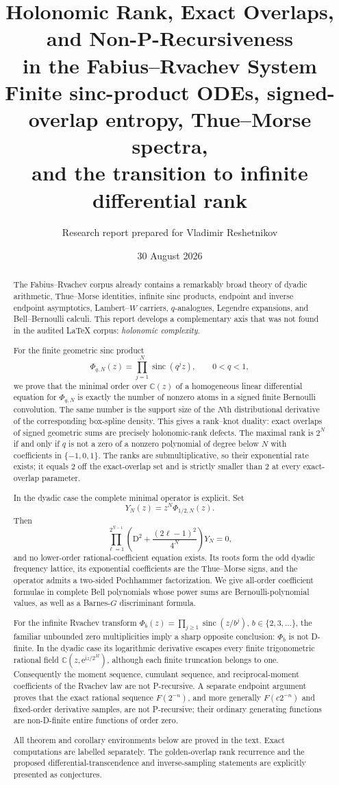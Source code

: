 \documentclass[11pt]{article}
\title{\textbf{Holonomic Rank, Exact Overlaps, and Non-P-Recursiveness\\
 in the Fabius--Rvachev System}\\[0.6em]
\large Finite sinc-product ODEs, signed-overlap entropy, Thue--Morse spectra,\\
and the transition to infinite differential rank}
\author{Research report prepared for Vladimir Reshetnikov}
\date{30 August 2026}
\numberwithin{equation}{section}
\theoremstyle{definition}
\theoremstyle{remark}
\newcommand{\C}{\mathbb C}
\newcommand{\ii}{\mathrm i}
\newcommand{\e}{\mathrm e}
\newcommand{\D}{\mathrm D}
\newcommand{\sinc}{\operatorname{sinc}}
\begin{document}
\maketitle

\begin{abstract}
The Fabius--Rvachev corpus already contains a remarkably broad theory of dyadic
arithmetic, Thue--Morse identities, infinite sinc products, endpoint and inverse
endpoint asymptotics, Lambert--$W$ carriers, $q$-analogues, Legendre expansions,
and Bell--Bernoulli calculi.  This report develops a complementary axis that was
not found in the audited LaTeX corpus: \emph{holonomic complexity}.

For the finite geometric sinc product
\[
  \Phi_{q,N}(z)=\prod_{j=1}^{N}\sinc(q^jz),\qquad 0<q<1,
\]
we prove that the minimal order over $\C(z)$ of a homogeneous linear
differential equation for $\Phi_{q,N}$ is exactly the number of nonzero atoms in
a signed finite Bernoulli convolution.  The same number is the support size of
the $N$th distributional derivative of the corresponding box-spline density.
This gives a rank--knot duality: exact overlaps of signed geometric sums are
precisely holonomic-rank defects.  The maximal rank is $2^N$ if and only if $q$
is not a zero of a nonzero polynomial of degree below $N$ with coefficients in
$\{-1,0,1\}$.  The ranks are submultiplicative, so their exponential rate
exists; it equals $2$ off the exact-overlap set and is strictly smaller than $2$
at every exact-overlap parameter.

In the dyadic case the complete minimal operator is explicit.  Set
\[
 Y_N(z)=z^N\Phi_{1/2,N}(z).
\]
Then
\[
 \prod_{\ell=1}^{2^{N-1}}
 \left(\D^2+\frac{(2\ell-1)^2}{4^N}\right)Y_N=0,
\]
and no lower-order rational-coefficient equation exists.  Its roots form the
odd dyadic frequency lattice, its exponential coefficients are the
Thue--Morse signs, and the operator admits a two-sided Pochhammer factorization.
We give all-order coefficient formulae in complete Bell polynomials whose power
sums are Bernoulli-polynomial values, as well as a Barnes-$G$ discriminant
formula.

For the infinite Rvachev transform
$\Phi_b(z)=\prod_{j\ge1}\sinc(z/b^j)$, $b\in\{2,3,\ldots\}$, the familiar
unbounded zero multiplicities imply a sharp opposite conclusion: $\Phi_b$ is
not D-finite.  In the dyadic case its logarithmic derivative escapes every
finite trigonometric rational field $\C(z,\e^{\ii z/2^M})$, although each finite
truncation belongs to one.  Consequently the moment sequence, cumulant
sequence, and reciprocal-moment coefficients of the Rvachev law are not
P-recursive.  A separate endpoint argument proves that the exact rational
sequence $F(2^{-n})$, and more generally $F(c2^{-n})$ and fixed-order derivative
samples, are not P-recursive; their ordinary generating functions are
non-D-finite entire functions of order zero.

All theorem and corollary environments below are proved in the text.  Exact
computations are labelled separately.  The golden-overlap rank recurrence and
the proposed differential-transcendence and inverse-sampling statements are
explicitly presented as conjectures.
\end{abstract}
\end{document}
